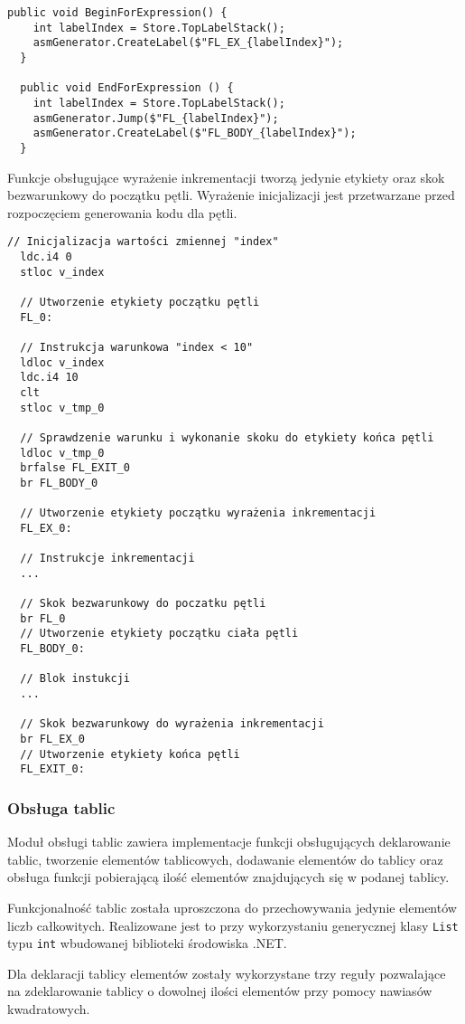\begin{lstlisting}[language=CSharp, caption={Implementacja funkcji obsługująca wyrażenie inkrementacji}, label=alg:for2]
  public void BeginForExpression() {
    int labelIndex = Store.TopLabelStack();
    asmGenerator.CreateLabel($"FL_EX_{labelIndex}");
  }

  public void EndForExpression () {
    int labelIndex = Store.TopLabelStack();
    asmGenerator.Jump($"FL_{labelIndex}");
    asmGenerator.CreateLabel($"FL_BODY_{labelIndex}");
  }
\end{lstlisting}

\par Funkcje obsługujące wyrażenie inkrementacji tworzą jedynie etykiety oraz skok bezwarunkowy do początku pętli. Wyrażenie inicjalizacji jest przetwarzane przed rozpoczęciem generowania kodu dla pętli.

\begin{lstlisting}[language=IL, caption={Kod assemblera przedstawiający konstrukcję \texttt{while}}, label=alg:while5]
  // Inicjalizacja wartości zmiennej "index"
  ldc.i4 0
  stloc v_index

  // Utworzenie etykiety początku pętli 
  FL_0: 
  
  // Instrukcja warunkowa "index < 10"
  ldloc v_index
  ldc.i4 10
  clt
  stloc v_tmp_0

  // Sprawdzenie warunku i wykonanie skoku do etykiety końca pętli
  ldloc v_tmp_0
  brfalse FL_EXIT_0
  br FL_BODY_0
  
  // Utworzenie etykiety początku wyrażenia inkrementacji
  FL_EX_0: 

  // Instrukcje inkrementacji
  ...
  
  // Skok bezwarunkowy do poczatku pętli
  br FL_0
  // Utworzenie etykiety początku ciała pętli
  FL_BODY_0: 

  // Blok instukcji
  ...
  
  // Skok bezwarunkowy do wyrażenia inkrementacji
  br FL_EX_0
  // Utworzenie etykiety końca pętli
  FL_EXIT_0: 
\end{lstlisting}

\subsubsection{Obsługa tablic}
Moduł obsługi tablic zawiera implementacje funkcji obsługujących deklarowanie tablic, tworzenie elementów tablicowych, dodawanie elementów do tablicy oraz obsługa funkcji pobierającą ilość elementów znajdujących się w podanej tablicy.
\par Funkcjonalność tablic została uproszczona do przechowywania jedynie elementów liczb całkowitych. Realizowane jest to przy wykorzystaniu generycznej klasy \texttt{List} typu \texttt{int} wbudowanej biblioteki środowiska .NET.
\par Dla deklaracji tablicy elementów zostały wykorzystane trzy reguły pozwalające na zdeklarowanie tablicy o dowolnej ilości elementów przy pomocy nawiasów kwadratowych.


